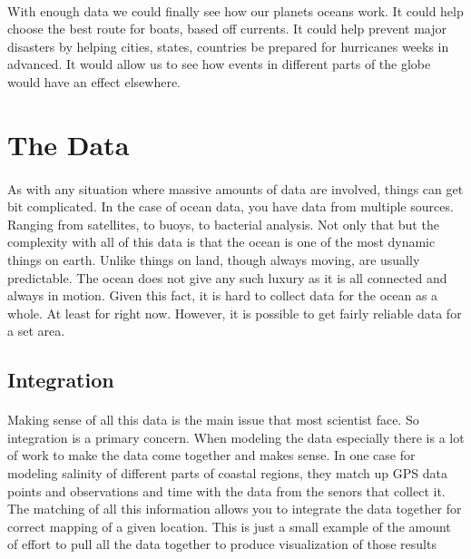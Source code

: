 \documentclass[sigconf]{acmart}
\begin{document}
\paragraph{}
With enough data we could finally see how our planets oceans work.  It could help choose the best route for boats, based off currents.  It could help prevent major disasters by helping cities, states, countries be prepared for hurricanes weeks in advanced.  It would allow us to see how events in different parts of the globe would have an effect elsewhere.

\section{The Data}

\paragraph{}
As with any situation where massive amounts of data are involved, things can get bit complicated.  In the case of ocean data, you have data from multiple sources.  Ranging from satellites, to buoys, to bacterial analysis.  Not only that but the complexity with all of this data is that the ocean is one of the most dynamic things on earth.  Unlike things on land, though always moving, are usually predictable.  The ocean does not give any such luxury as it is all connected and always in motion.  Given this fact, it is hard to collect data for the ocean as a whole.  At least for right now.  However, it is possible to get fairly reliable data for a set area. 

\subsection{Integration}

\paragraph{}
Making sense of all this data is the main issue that most scientist face.  So integration is a primary concern.  When modeling the data especially there is a lot of work to make the data come together and makes sense.  In one case for modeling salinity of different parts of coastal regions, they match up GPS data points and observations and time with the data from the senors that collect it.  The matching of all this information allows you to integrate the data together for correct mapping of a given location. \cite{Liu2016} This is just a small example of the amount of effort to pull all the data together to produce visualization of those results
\end{document}
